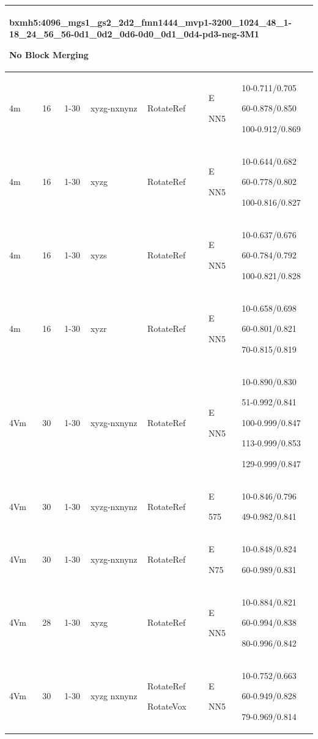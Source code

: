 \documentclass[,table,dvipsnames]{article}
\begin{document}
\begin{tabular}{|p{1.5cm}|p{1.5cm}|p{1cm}|p{1.5cm}|p{1.5cm}|p{1.5cm}|p{5cm}| }
	\hline \hline
	\multicolumn{7}{|p{14cm}|}{bxmh5:4096\_mgs1\_gs2\_2d2\_fmn1444\_mvp1-3200\_1024\_48\_1-18\_24\_56\_56-0d1\_0d2\_0d6-0d0\_0d1\_0d4-pd3-neg-3M1\par No Block Merging 
	}\\
	\hline
	4m & 16 & 1-30 & xyzg-nxnynz & RotateRef & E\par NN5 & 10-0.711/0.705\par 60-0.878/0.850\par 100-0.912/0.869\\
	\hline 
	4m & 16 & 1-30 & xyzg & RotateRef & E\par NN5 & 10-0.644/0.682\par 60-0.778/0.802\par 100-0.816/0.827\\
	\hline 
	4m & 16 & 1-30 & xyzs & RotateRef & E\par NN5 & 10-0.637/0.676\par 60-0.784/0.792\par 100-0.821/0.828\\
	\hline 
	4m & 16 & 1-30 & xyzr & RotateRef & E\par NN5 & 10-0.658/0.698\par 60-0.801/0.821\par 70-0.815/0.819\\
	\hline 
	4Vm & 30 & 1-30 & xyzg-nxnynz & RotateRef & E\par NN5 & 10-0.890/0.830\par 51-0.992/0.841\par 100-0.999/0.847\par 113-0.999/0.853\par 129-0.999/0.847\\
	\hline 
	4Vm & 30 & 1-30 & xyzg-nxnynz & RotateRef & E\par 575 & 10-0.846/0.796\par 49-0.982/0.841\\
	\hline 
	4Vm & 30 & 1-30 & xyzg-nxnynz & RotateRef & E\par N75 & 10-0.848/0.824\par 60-0.989/0.831\\
	\hline
	4Vm & 28 & 1-30 & xyzg & RotateRef & E\par NN5 & 10-0.884/0.821\par 60-0.994/0.838\par 80-0.996/0.842\\
	\hline 
	4Vm & 30 & 1-30 & xyzg nxnynz & RotateRef\par RotateVox & E\par NN5 & 10-0.752/0.663\par 60-0.949/0.828\par 79-0.969/0.814\\
	\hline \hline
	

\end{tabular}
\end{document}
